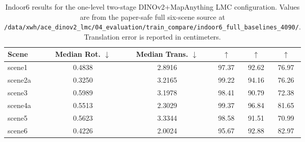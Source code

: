 \begin{table}[t]
\centering
\caption{Indoor6 results for the one-level two-stage DINOv2+MapAnything LMC configuration. Values are from the paper-safe full six-scene source at \texttt{/data/xwh/ace\_dinov2\_lmc/04\_evaluation/train\_compare/indoor6\_full\_baselines\_4090/}. Translation error is reported in centimeters.}
\label{tab:indoor6_dino_mapanything}
\begin{tabular}{lccccc}
\toprule
Scene & Median Rot. $\downarrow$ & Median Trans. $\downarrow$ & \acctwentyfive{} $\uparrow$ & \accten{} $\uparrow$ & \accfive{} $\uparrow$ \\
\midrule
scene1  & 0.4838 & 2.8916 & 97.37 & 92.62 & 76.97 \\
scene2a & 0.3250 & 3.2165 & 99.22 & 94.16 & 76.26 \\
scene3  & 0.5989 & 3.1978 & 98.41 & 90.79 & 72.38 \\
scene4a & 0.5513 & 2.3029 & 99.37 & 96.84 & 81.65 \\
scene5  & 0.5623 & 3.3344 & 98.58 & 91.51 & 70.99 \\
scene6  & 0.4226 & 2.0024 & 95.67 & 92.88 & 82.97 \\
\bottomrule
\end{tabular}
\end{table}
